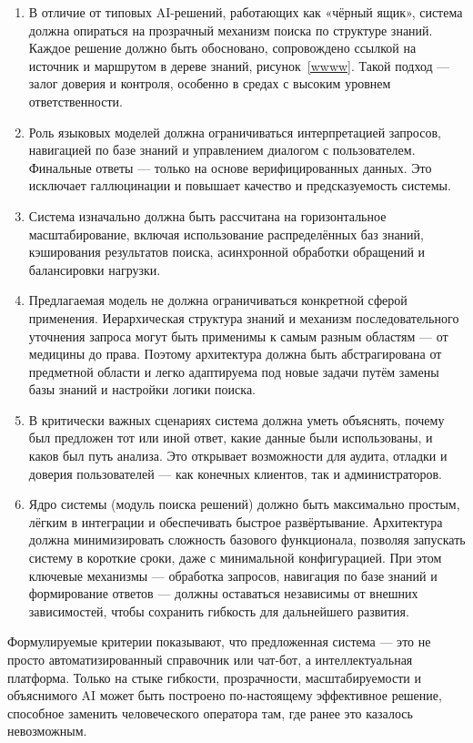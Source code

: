\begin{enumerate}[label=\arabic*.]
    \item В отличие от типовых AI-решений, работающих как «чёрный ящик», система должна опираться на прозрачный механизм поиска по структуре знаний. Каждое решение должно быть обосновано, сопровождено ссылкой на источник и маршрутом в дереве знаний, рисунок~\ref{wwww}. Такой подход — залог доверия и контроля, особенно в средах с высоким уровнем ответственности.
    \item Роль языковых моделей должна ограничиваться интерпретацией запросов, навигацией по базе знаний и управлением диалогом с пользователем. Финальные ответы — только на основе верифицированных данных. Это исключает галлюцинации и повышает качество и предсказуемость системы.
    \item Система изначально должна быть рассчитана на горизонтальное масштабирование, включая использование распределённых баз знаний, кэширования результатов поиска, асинхронной обработки обращений и балансировки нагрузки.
    \item Предлагаемая модель не должна ограничиваться конкретной сферой применения. Иерархическая структура знаний и механизм последовательного уточнения запроса могут быть применимы к самым разным областям — от медицины до права. Поэтому архитектура должна быть абстрагирована от предметной области и легко адаптируема под новые задачи путём замены базы знаний и настройки логики поиска.
    \item В критически важных сценариях система должна уметь объяснять, почему был предложен тот или иной ответ, какие данные были использованы, и каков был путь анализа. Это открывает возможности для аудита, отладки и доверия пользователей — как конечных клиентов, так и администраторов.
    \item Ядро системы (модуль поиска решений) должно быть максимально простым, лёгким в интеграции и обеспечивать быстрое развёртывание. Архитектура должна минимизировать сложность базового функционала, позволяя запускать систему в короткие сроки, даже с минимальной конфигурацией. При этом ключевые механизмы — обработка запросов, навигация по базе знаний и формирование ответов — должны оставаться независимы от внешних зависимостей, чтобы сохранить гибкость для дальнейшего развития.
\end{enumerate}

Формулируемые критерии показывают, что предложенная система — это не просто автоматизированный справочник или чат-бот, а интеллектуальная платформа. Только на стыке гибкости, прозрачности, масштабируемости и объяснимого AI может быть построено по-настоящему эффективное решение, способное заменить человеческого оператора там, где ранее это казалось невозможным.

